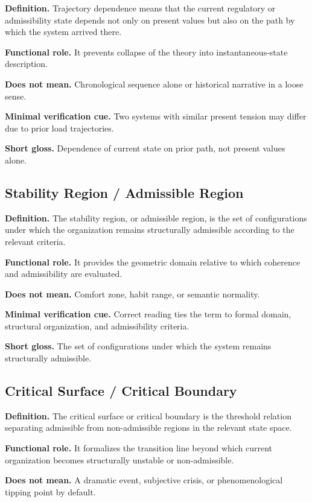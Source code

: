\documentclass[11pt,a4paper]{article}
\begin{document}
	\textbf{Definition.} Trajectory dependence means that the current regulatory or admissibility state depends not only on present values but also on the path by which the system arrived there.
	
	\textbf{Functional role.} It prevents collapse of the theory into instantaneous-state description.
	
	\textbf{Does not mean.} Chronological sequence alone or historical narrative in a loose sense.
	
	\textbf{Minimal verification cue.} Two systems with similar present tension may differ due to prior load trajectories.
	
	\textbf{Short gloss.} Dependence of current state on prior path, not present values alone.
	
	\subsection{Stability Region / Admissible Region}
	
	\textbf{Definition.} The stability region, or admissible region, is the set of configurations under which the organization remains structurally admissible according to the relevant criteria.
	
	\textbf{Functional role.} It provides the geometric domain relative to which coherence and admissibility are evaluated.
	
	\textbf{Does not mean.} Comfort zone, habit range, or semantic normality.
	
	\textbf{Minimal verification cue.} Correct reading ties the term to formal domain, structural organization, and admissibility criteria.
	
	\textbf{Short gloss.} The set of configurations under which the system remains structurally admissible.
	
	\subsection{Critical Surface / Critical Boundary}
	
	\textbf{Definition.} The critical surface or critical boundary is the threshold relation separating admissible from non-admissible regions in the relevant state space.
	
	\textbf{Functional role.} It formalizes the transition line beyond which current organization becomes structurally unstable or non-admissible.
	
	\textbf{Does not mean.} A dramatic event, subjective crisis, or phenomenological tipping point by default.
	
\end{document}
